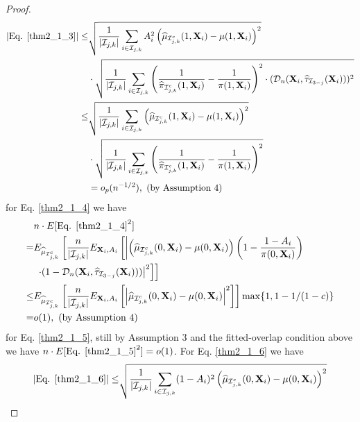 \documentclass[11pt]{article}
\theoremstyle{referenceplain}
\theoremstyle{referencedefinition}
\theoremstyle{referenceremark}
\begin{document}
\begin{proof}
    \begin{align*}
        |\text{Eq. }\eqref{thm2_1_3}|\leq&\sqrt{\frac{1}{|\mathcal{I}_{j,k}|}\sum_{i\in\mathcal{I}_{j,k}}A_i^2 \left(\widehat{\mu}_{\mathcal{I}_{j,k}^c}(1,\mathbf{X}_i)-\mu(1,\mathbf{X}_i)\right)^2}\\
        &\cdot\sqrt{\frac{1}{|\mathcal{I}_{j,k}|}\sum_{i\in\mathcal{I}_{j,k}}\left(\frac{1}{\widehat{\pi}_{\mathcal{I}_{j,k}^c}(1,\mathbf{X}_i)}-\frac{1}{\pi(1,\mathbf{X}_i)}\right)^2\cdot (\mathcal{D}_n(\mathbf{X}_i,\widehat{\tau}_{\mathcal{I}_{3-j}}(\mathbf{X}_i)))^2}\\
        \leq & \sqrt{\frac{1}{|\mathcal{I}_{j,k}|}\sum_{i\in\mathcal{I}_{j,k}} \left(\widehat{\mu}_{\mathcal{I}_{j,k}^c}(1,\mathbf{X}_i)-\mu(1,\mathbf{X}_i)\right)^2}\\
        &\cdot\sqrt{\frac{1}{|\mathcal{I}_{j,k}|}\sum_{i\in\mathcal{I}_{j,k}}\left(\frac{1}{\widehat{\pi}_{\mathcal{I}_{j,k}^c}(1,\mathbf{X}_i)}-\frac{1}{\pi(1,\mathbf{X}_i)}\right)^2}\\
        &=o_p(n^{-1/2}), \text{ (by Assumption 4)}
    \end{align*}
    for Eq. \eqref{thm2_1_4} we have
    \begin{align*}
        &n\cdot E[\text{Eq. }\eqref{thm2_1_4}^2]\\
        =&E_{\widehat{\mu}_{\mathcal{I}_{j,k}^c}}\left[\frac{n}{|\mathcal{I}_{j,k}|}E_{\mathbf{X}_i,A_i}\left[\left|\left(\widehat{\mu}_{\mathcal{I}_{j,k}^c}(0,\mathbf{X}_i)-\mu(0,\mathbf{X}_i)\right)\left(1-\frac{1-A_i}{\pi(0,\mathbf{X}_i)}\right)\right.\right.\right.\\
        &\left.\left.\left.\cdot (1-\mathcal{D}_n(\mathbf{X}_i,\widehat{\tau}_{\mathcal{I}_{3-j}}(\mathbf{X}_i)))\right|^2 \right]\right]\\
        \leq & E_{\widehat{\mu}_{\mathcal{I}_{j,k}^c}}\left[\frac{n}{|\mathcal{I}_{j,k}|}E_{\mathbf{X}_i,A_i}\left[\left|\widehat{\mu}_{\mathcal{I}_{j,k}^c}(0,\mathbf{X}_i)-\mu(0,\mathbf{X}_i)\right|^2\right]\right]\max\{1,1-1/(1-c)\}\\
        =&o(1), \text{ (by Assumption 4)}
    \end{align*}
    for Eq. \eqref{thm2_1_5}, still by Assumption 3 {and the fitted-overlap condition above} we have $n\cdot E[\text{Eq. }\eqref{thm2_1_5}^2]=o(1)$.
    For Eq. \eqref{thm2_1_6} we have
     \begin{align*}
        |\text{Eq. }\eqref{thm2_1_6}|\leq&\sqrt{\frac{1}{|\mathcal{I}_{j,k}|}\sum_{i\in\mathcal{I}_{j,k}}(1-A_i)^2 \left(\widehat{\mu}_{\mathcal{I}_{j,k}^c}(0,\mathbf{X}_i)-\mu(0,\mathbf{X}_i)\right)^2}\\

\end{align*}
\end{proof}
\end{document}
